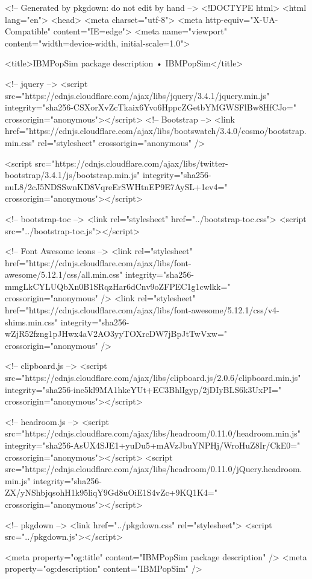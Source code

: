 <!-- Generated by pkgdown: do not edit by hand -->
<!DOCTYPE html>
<html lang="en">
  <head>
  <meta charset="utf-8">
<meta http-equiv="X-UA-Compatible" content="IE=edge">
<meta name="viewport" content="width=device-width, initial-scale=1.0">

<title>IBMPopSim package description • IBMPopSim</title>


<!-- jquery -->
<script src="https://cdnjs.cloudflare.com/ajax/libs/jquery/3.4.1/jquery.min.js" integrity="sha256-CSXorXvZcTkaix6Yvo6HppcZGetbYMGWSFlBw8HfCJo=" crossorigin="anonymous"></script>
<!-- Bootstrap -->
<link href="https://cdnjs.cloudflare.com/ajax/libs/bootswatch/3.4.0/cosmo/bootstrap.min.css" rel="stylesheet" crossorigin="anonymous" />


<script src="https://cdnjs.cloudflare.com/ajax/libs/twitter-bootstrap/3.4.1/js/bootstrap.min.js" integrity="sha256-nuL8/2cJ5NDSSwnKD8VqreErSWHtnEP9E7AySL+1ev4=" crossorigin="anonymous"></script>

<!-- bootstrap-toc -->
<link rel="stylesheet" href="../bootstrap-toc.css">
<script src="../bootstrap-toc.js"></script>

<!-- Font Awesome icons -->
<link rel="stylesheet" href="https://cdnjs.cloudflare.com/ajax/libs/font-awesome/5.12.1/css/all.min.css" integrity="sha256-mmgLkCYLUQbXn0B1SRqzHar6dCnv9oZFPEC1g1cwlkk=" crossorigin="anonymous" />
<link rel="stylesheet" href="https://cdnjs.cloudflare.com/ajax/libs/font-awesome/5.12.1/css/v4-shims.min.css" integrity="sha256-wZjR52fzng1pJHwx4aV2AO3yyTOXrcDW7jBpJtTwVxw=" crossorigin="anonymous" />

<!-- clipboard.js -->
<script src="https://cdnjs.cloudflare.com/ajax/libs/clipboard.js/2.0.6/clipboard.min.js" integrity="sha256-inc5kl9MA1hkeYUt+EC3BhlIgyp/2jDIyBLS6k3UxPI=" crossorigin="anonymous"></script>

<!-- headroom.js -->
<script src="https://cdnjs.cloudflare.com/ajax/libs/headroom/0.11.0/headroom.min.js" integrity="sha256-AsUX4SJE1+yuDu5+mAVzJbuYNPHj/WroHuZ8Ir/CkE0=" crossorigin="anonymous"></script>
<script src="https://cdnjs.cloudflare.com/ajax/libs/headroom/0.11.0/jQuery.headroom.min.js" integrity="sha256-ZX/yNShbjqsohH1k95liqY9Gd8uOiE1S4vZc+9KQ1K4=" crossorigin="anonymous"></script>

<!-- pkgdown -->
<link href="../pkgdown.css" rel="stylesheet">
<script src="../pkgdown.js"></script>




<meta property="og:title" content="IBMPopSim package description" />
<meta property="og:description" content="IBMPopSim" />




